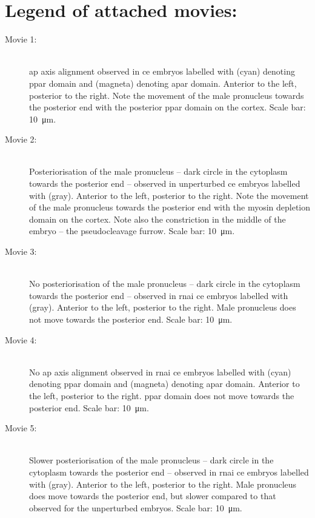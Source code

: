 \section*{Legend of attached movies:}
\begin{description}
\item[Movie 1:]\hfill\\
\ac{ap} axis alignment observed in \ac{ce} embryos labelled with  (cyan) denoting \ac{ppar} domain and  (magneta) denoting \ac{apar} domain. Anterior to the left, posterior to the right. Note the movement of the male pronucleus towards the posterior end with the posterior \ac{ppar} domain on the cortex. Scale bar: \SI{10}{\micro\meter}.
\item[Movie 2:]\hfill\\
Posteriorisation of the male pronucleus -- dark circle in the cytoplasm towards the posterior end -- observed in unperturbed \ac{ce} embryos labelled with  (gray). Anterior to the left, posterior to the right. Note the movement of the male pronucleus towards the posterior end with the myosin depletion domain on the cortex. Note also the constriction in the middle of the embryo -- the pseudocleavage furrow. Scale bar: \SI{10}{\micro\meter}.
\item[Movie 3:]\hfill\\
No posteriorisation of the male pronucleus -- dark circle in the cytoplasm towards the posterior end -- observed in  \ac{rnai} \ac{ce} embryos labelled with  (gray). Anterior to the left, posterior to the right. Male pronucleus does not move towards the posterior end. Scale bar: \SI{10}{\micro\meter}.
\item[Movie 4:]\hfill\\
No \ac{ap} axis alignment observed in  \ac{rnai} \ac{ce} embryos labelled with  (cyan) denoting \ac{ppar} domain and  (magneta) denoting \ac{apar} domain. Anterior to the left, posterior to the right. \ac{ppar} domain does not move towards the posterior end. Scale bar: \SI{10}{\micro\meter}.
\item[Movie 5:]\hfill\\
Slower posteriorisation of the male pronucleus -- dark circle in the cytoplasm towards the posterior end -- observed in  \ac{rnai} \ac{ce} embryos labelled with  (gray). Anterior to the left, posterior to the right. Male pronucleus does move towards the posterior end, but slower compared to that observed for the unperturbed embryos. Scale bar: \SI{10}{\micro\meter}.

\end{description}
